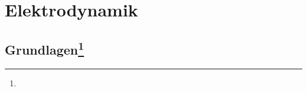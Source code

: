 \documentclass[12pt,a4paper]{article}
\renewcommand{\=}[1]{\stackrel{#1}{=}}
\theoremstyle{definition}
\theoremstyle{remark}
\begin{document}




\newpage
\section{Elektrodynamik}

\subsection[Grundlagen]{Grundlagen\let\thefootnote\relax\footnote{}}
\end{document}
